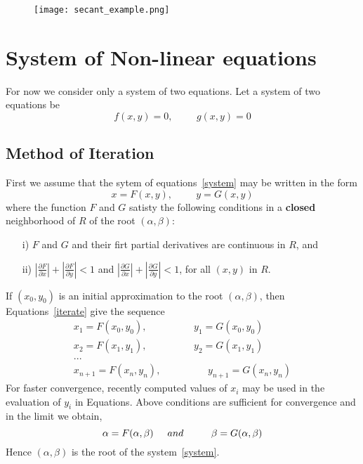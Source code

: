\documentclass[aima203_lecturenotes_ku.tex]{subfiles}
\begin{document}
\begin{figure}[h]
  \centering
\texttt{[image: secant\_example.png]}
\end{figure}

\section{System of Non-linear equations}
For now we consider only a system of two equations. Let a system of two equations be
\begin{equation}
  \label{system}
  f(x,y)=0, \hspace{1cm} g(x,y)=0
\end{equation}
\subsection{Method of Iteration}
First we assume that the sytem of equations~\ref{system} may be written in the form
\begin{equation}
  \label{iterate}
  x=F(x,y), \hspace{1cm} y=G(x,y)
\end{equation}
where the function $F$ and $G$ satisty the following conditions in a \textbf{closed} neighborhood of $R$ of the root $(\alpha, \beta)$:
\begin{enumerate}
\item[i)] $F$ and $G$ and their firt partial derivatives are continuous in $R$, and
  \item[ii)] $\displaystyle \left | \frac{\partial F}{\partial x} \right | + \left | \frac{\partial F}{\partial y} \right | < 1$ and $\displaystyle \left | \frac{\partial G}{\partial x} \right | + \left | \frac{\partial G}{\partial y} \right | < 1$, for all $(x,y)$ in $R$.
\end{enumerate}
If $(x_0,y_0)$ is an initial approximation to the root $(\alpha, \beta)$, then Equations~\ref{iterate} give the sequence
\begin{equation}
\begin{gathered}
  x_1 = F(x_0,y_0), \hspace{2cm} y_1 = G(x_0,y_0) \\
  x_2 = F(x_1,y_1), \hspace{2cm} y_2 = G(x_1,y_1) \\
  ... \\
  x_{n+1} = F(x_n,y_n), \hspace{2cm} y_{n+1} = G(x_n,y_n)
\end{gathered}
\end{equation}
For faster convergence, recently computed values of $x_i$ may be used in the evaluation of $y_i$ in Equations. Above conditions are sufficient for convergence and in the limit we obtain,
\begin{equation}
  \alpha = F(\alpha, \beta) \hspace{5mm} and \hspace{1cm} \beta=G(\alpha, \beta)
\end{equation}
Hence $(\alpha, \beta)$ is the root of the system~\ref{system}.
\end{document}
